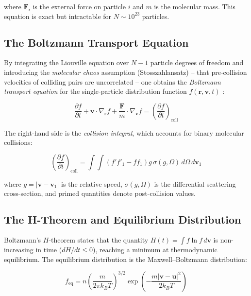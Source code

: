 \noindent where $\mathbf{F}_i$ is the external force on particle $i$ and $m$ is the molecular mass. This equation is exact but intractable for $N \sim 10^{23}$ particles.

\subsection{The Boltzmann Transport Equation}

By integrating the Liouville equation over $N-1$ particle degrees of freedom and introducing the \textit{molecular chaos} assumption (Stosszahlansatz) -- that pre-collision velocities of colliding pairs are uncorrelated -- one obtains the \textit{Boltzmann transport equation} for the single-particle distribution function $f(\mathbf{r}, \mathbf{v}, t)$ \cite{bird1994molecular}:

\begin{equation}
    \frac{\partial f}{\partial t} + \mathbf{v} \cdot \nabla_{\mathbf{r}} f + \frac{\mathbf{F}}{m} \cdot \nabla_{\mathbf{v}} f = \left( \frac{\partial f}{\partial t} \right)_{\text{coll}}
    \label{eq:boltzmann}
\end{equation}

\noindent The right-hand side is the \textit{collision integral}, which accounts for binary molecular collisions:

\begin{equation}
    \left( \frac{\partial f}{\partial t} \right)_{\text{coll}} = \int \int \left( f' f'_1 - f f_1 \right) g \, \sigma(g, \Omega) \, d\Omega \, d\mathbf{v}_1
    \label{eq:collision_integral}
\end{equation}

\noindent where $g = |\mathbf{v} - \mathbf{v}_1|$ is the relative speed, $\sigma(g, \Omega)$ is the differential scattering cross-section, and primed quantities denote post-collision values.

\subsection{The H-Theorem and Equilibrium Distribution}

Boltzmann's $H$-theorem states that the quantity $H(t) = \int f \ln f \, d\mathbf{v}$ is non-increasing in time ($dH/dt \leq 0$), reaching a minimum at thermodynamic equilibrium. The equilibrium distribution is the Maxwell--Boltzmann distribution:

\begin{equation}
    f_{\text{eq}} = n \left( \frac{m}{2\pi k_B T} \right)^{3/2} \exp\left( -\frac{m|\mathbf{v} - \mathbf{u}|^2}{2 k_B T} \right)
    \label{eq:maxwell_boltzmann}
\end{equation}

